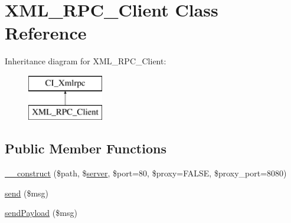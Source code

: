 \hypertarget{class_x_m_l___r_p_c___client}{}\section{X\+M\+L\+\_\+\+R\+P\+C\+\_\+\+Client Class Reference}
\label{class_x_m_l___r_p_c___client}
Inheritance diagram for X\+M\+L\+\_\+\+R\+P\+C\+\_\+\+Client\+:\begin{figure}[H]
\begin{center}
\leavevmode
\includegraphics[height=2.000000cm]{class_x_m_l___r_p_c___client}
\end{center}
\end{figure}
\subsection*{Public Member Functions}
\begin{DoxyCompactItemize}
\item 
\mbox{\hyperlink{class_x_m_l___r_p_c___client_a435592cda93b19f7d7a5e83570007a11}{\+\_\+\+\_\+construct}} (\$path, \$\mbox{\hyperlink{class_c_i___xmlrpc_a533c88bfc6c8e268d9dfc9226dbd9b40}{server}}, \$port=80, \$proxy=F\+A\+L\+SE, \$proxy\+\_\+port=8080)
\item 
\mbox{\hyperlink{class_x_m_l___r_p_c___client_a88ed83a2d0db4ec9626910ba01e603a1}{send}} (\$msg)
\item 
\mbox{\hyperlink{class_x_m_l___r_p_c___client_ae3dbeba0ca06e54dfdc7895a84636f98}{send\+Payload}} (\$msg)
\end{DoxyCompactItemize}
